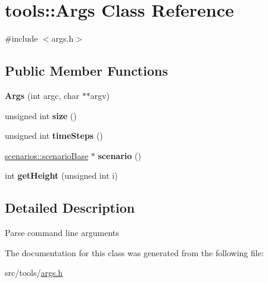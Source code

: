 \hypertarget{classtools_1_1Args}{\section{tools\-:\-:Args Class Reference}
\label{classtools_1_1Args}
}


{\ttfamily \#include $<$args.\-h$>$}

\subsection*{Public Member Functions}
\begin{DoxyCompactItemize}
\item 
\hypertarget{classtools_1_1Args_ae76fc7da42f02c3803c704945e09889a}{{\bfseries Args} (int argc, char $\ast$$\ast$argv)}\label{classtools_1_1Args_ae76fc7da42f02c3803c704945e09889a}

\item 
\hypertarget{classtools_1_1Args_a797dee3c2572f4970633923efe02a952}{unsigned int {\bfseries size} ()}\label{classtools_1_1Args_a797dee3c2572f4970633923efe02a952}

\item 
\hypertarget{classtools_1_1Args_a80525b2b8c459ed083973934092078b2}{unsigned int {\bfseries time\-Steps} ()}\label{classtools_1_1Args_a80525b2b8c459ed083973934092078b2}

\item 
\hypertarget{classtools_1_1Args_ae61f9874d83ddaa1ecfd75006b12b9b3}{\hyperlink{classscenarios_1_1scenarioBase}{scenarios\-::scenario\-Base} $\ast$ {\bfseries scenario} ()}\label{classtools_1_1Args_ae61f9874d83ddaa1ecfd75006b12b9b3}

\item 
\hypertarget{classtools_1_1Args_a0f43e096b241fd096a33318e529b79b9}{int {\bfseries get\-Height} (unsigned int i)}\label{classtools_1_1Args_a0f43e096b241fd096a33318e529b79b9}

\end{DoxyCompactItemize}


\subsection{Detailed Description}
Parse command line arguments 

The documentation for this class was generated from the following file\-:\begin{DoxyCompactItemize}
\item 
src/tools/\hyperlink{args_8h}{args.\-h}\end{DoxyCompactItemize}

